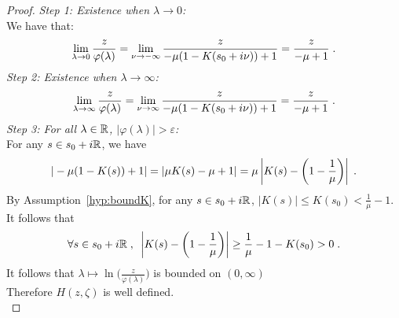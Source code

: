 \documentclass[11pt]{amsart}
\begin{document}
\begin{proof}
\textit{Step 1: Existence when $\lambda \to 0$:}\\
We have that: 
\begin{align*}
    \lim_{\lambda \to 0}\frac{z}{\varphi(\lambda)} = \lim_{\nu\to-\infty}\frac{z}{-\mu(1-K(s_0+i\nu))+1} = \frac{z}{-\mu+1}
    \; .
\end{align*}
\textit{Step 2: Existence when $\lambda \to \infty$:}
\begin{align*}
    \lim_{\lambda \to \infty}\frac{z}{\varphi(\lambda)} = \lim_{\nu\to\infty}\frac{z}{-\mu(1-K(s_0+i\nu))+1} = \frac{z}{-\mu+1}
    \; .
\end{align*}
\textit{Step 3: For all $\lambda \in \mathbb{R}$, $|\varphi(\lambda)| > \varepsilon$: }\\
For any $s \in s_0 + i\mathbb{R}$, we have
    \begin{align*}
        |-\mu(1-K(s))+1| = |\mu K(s) - \mu + 1| = \mu \left|K(s) - \left(1-\frac{1}{\mu}\right)\right|
        \; .
    \end{align*}
By Assumption~\ref{hyp:boundK}, for any $s \in s_0 + i\mathbb{R}$, $|K(s)| \leq K(s_0) < \frac{1}{\mu} - 1$. It follows that
\begin{align*}
    \forall s \in s_0 + i\mathbb{R}
    \; , \enspace
    \left|K(s) - \left(1-\frac{1}{\mu}\right)\right| \geq \frac{1}\mu - 1 - K(s_0) > 0
    \; .
\end{align*}
It follows that $\lambda \mapsto \ln\Big(\frac{z}{\varphi(\lambda)}\Big)$ is bounded on $(0, \infty)$\\

Therefore
$H(z,\zeta)$ is well defined.\\


\end{proof}
\end{document}
